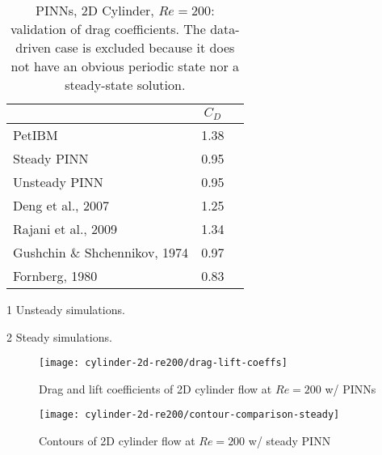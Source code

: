 \begin{table}[hbt!]
    \begin{threeparttable}[b]
        \begin{tabular}{lcc}
            \toprule
            & $C_D$ \\
            \midrule
            PetIBM & 1.38   \\
            Steady PINN & 0.95 \\
            Unsteady PINN & 0.95 \\
            Deng et al., 2007\cite{deng_hydrodynamic_2007}\tnote{1} & 1.25 \\
            Rajani et al., 2009\cite{Rajani2009}\tnote{1} & 1.34 \\
            Gushchin \& Shchennikov, 1974\cite{gushchin_numerical_1974}\tnote{2} & 0.97 \\
            Fornberg, 1980\cite{fornberg_numerical_1980}\tnote{2} & 0.83 \\
            \bottomrule
        \end{tabular}%
        \begin{tablenotes}
            \footnotesize
            \item [1] Unsteady simulations.
            \item [2] Steady simulations.
        \end{tablenotes}
        \caption{%
            PINNs, 2D Cylinder, $Re=200$: validation of drag coefficients.%
            The data-driven case is excluded because it does not have an obvious periodic state nor a steady-state solution.%
        }%
        \label{table:cylinder-2d-re200-cd}
    \end{threeparttable}
\end{table}%

\begin{figure}[!hbt]
    \centering%
    \texttt{[image: cylinder-2d-re200/drag-lift-coeffs]}%
    \caption{%
        Drag and lift coefficients of 2D cylinder flow at $Re=\num{200}$ w/ PINNs
    }
    \label{fig:cylinder-re200-drag-lift}%
\end{figure}

\lipsum[1]

\begin{figure}[!hbt]
    \centering%
    \texttt{[image: cylinder-2d-re200/contour-comparison-steady]}%
    \caption{%
        Contours of 2D cylinder flow at $Re=\num{200}$ w/ steady PINN
    }
    \label{fig:cylinder-re200-steady-pinn-contours}%
\end{figure}

